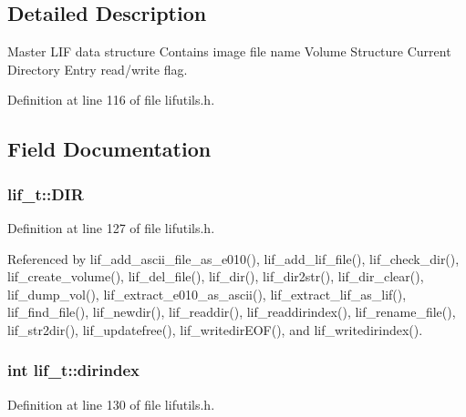 \subsection{Detailed Description}
Master L\+IF data structure Contains image file name Volume Structure Current Directory Entry read/write flag. 

Definition at line 116 of file lifutils.\+h.



\subsection{Field Documentation}
\subsubsection[{\texorpdfstring{D\+IR}{DIR}}]{ lif\+\_\+t\+::\+D\+IR}\hypertarget{structlif__t_aefeaa526c04a2b8715b0392feeec52a3}{}\label{structlif__t_aefeaa526c04a2b8715b0392feeec52a3}


Definition at line 127 of file lifutils.\+h.



Referenced by lif\+\_\+add\+\_\+ascii\+\_\+file\+\_\+as\+\_\+e010(), lif\+\_\+add\+\_\+lif\+\_\+file(), lif\+\_\+check\+\_\+dir(), lif\+\_\+create\+\_\+volume(), lif\+\_\+del\+\_\+file(), lif\+\_\+dir(), lif\+\_\+dir2str(), lif\+\_\+dir\+\_\+clear(), lif\+\_\+dump\+\_\+vol(), lif\+\_\+extract\+\_\+e010\+\_\+as\+\_\+ascii(), lif\+\_\+extract\+\_\+lif\+\_\+as\+\_\+lif(), lif\+\_\+find\+\_\+file(), lif\+\_\+newdir(), lif\+\_\+readdir(), lif\+\_\+readdirindex(), lif\+\_\+rename\+\_\+file(), lif\+\_\+str2dir(), lif\+\_\+updatefree(), lif\+\_\+writedir\+E\+O\+F(), and lif\+\_\+writedirindex().

\subsubsection[{\texorpdfstring{dirindex}{dirindex}}]{\setlength{\rightskip}{0pt plus 5cm}int lif\+\_\+t\+::dirindex}\hypertarget{structlif__t_a74f8af3dc203c3c6b9dea3829bb4b6fa}{}\label{structlif__t_a74f8af3dc203c3c6b9dea3829bb4b6fa}


Definition at line 130 of file lifutils.\+h.




